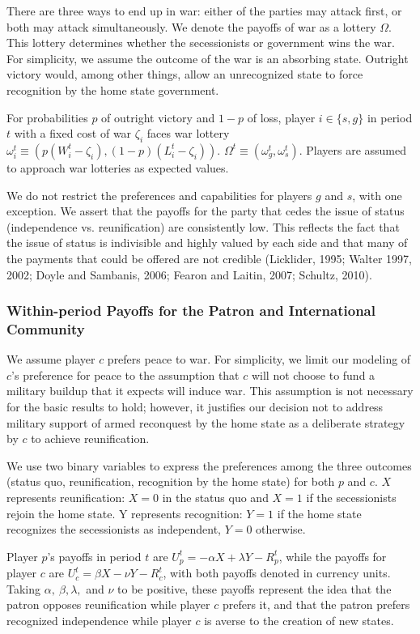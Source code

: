 There are three ways to end up in war: either of the parties may attack first, or both may attack simultaneously. We denote the payoffs of war as a lottery $\Omega$. This lottery determines whether the secessionists or government wins the war. For simplicity, we assume the outcome of the war is an absorbing state. Outright victory would, among other things, allow an unrecognized state to force recognition by the home state government.

For probabilities $p$ of outright victory and $1-p$ of loss, player $i \in \{s, g\}$ in period $t$ with a fixed cost of war $\zeta_i$ faces war lottery $\omega_i^t \equiv (p (W_i^t-\zeta_i), \left(1-p\right)( L_i^t-\zeta_i))$. $\Omega^t \equiv (\omega_g^t, \omega_s^t).$ Players are assumed to approach war lotteries as expected values.

We do not restrict the preferences and capabilities for players $g$ and $s$, with one exception. We assert that the payoffs for the party that cedes the issue of status (independence vs. reunification) are consistently low. This reflects the fact that the issue of status is indivisible and highly valued by each side and that many of the payments that could be offered are not credible (Licklider, 1995; Walter 1997, 2002; Doyle and Sambanis, 2006; Fearon and Laitin, 2007; Schultz, 2010).



\subsubsection{Within-period Payoffs for the Patron and International Community}
We assume player $c$ prefers peace to war. For simplicity, we limit our modeling of $c$'s preference for peace to the assumption that $c$ will not choose to fund a military buildup that it expects will induce war. This assumption is not necessary for the basic results to hold; however, it justifies our decision not to address military support of armed reconquest by the home state as a deliberate strategy by $c$ to achieve reunification. 

We use two binary variables to express the preferences among the three outcomes (status quo, reunification, recognition by the home state) for both $p$ and $c$. $X$ represents reunification: $X=0$ in the status quo and $X=1$ if the secessionists rejoin the home state. Y represents recognition: $Y=1$ if the home state recognizes the secessionists as independent, $Y=0$ otherwise. 

Player $p$'s payoffs in period $t$ are $U_p^t= -\alpha X+\lambda Y -R_p^t$, while the payoffs for player $c$ are $U_c^t= \beta X-\nu Y -R_c^t$, with both payoffs denoted in currency units. Taking $\alpha, \ \beta, \lambda,$ and $\nu$ to be positive, these payoffs represent the idea that the patron opposes reunification while player $c$ prefers it, and that the patron prefers recognized independence while player $c$ is averse to the creation of new states.



